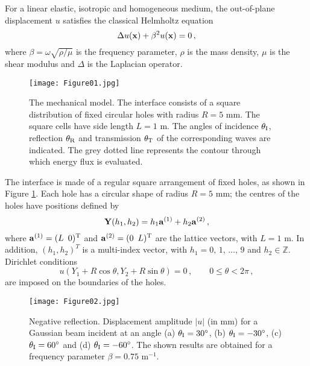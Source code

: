 \documentclass[10p]{article}
\begin{document}
For a linear elastic, isotropic and homogeneous medium, the out-of-plane displacement $u$ satisfies the classical Helmholtz equation
\begin{equation}
\label{eqn002}
\Delta u({\bf x}) + \beta^2 u({\bf x}) = 0\,,
\end{equation}
where $\beta=\omega\sqrt{\rho/\mu}$ is the frequency parameter, $\rho$ is the mass density, $\mu$ is the shear modulus and $\Delta$ is the Laplacian operator.

\begin{figure}
\begin{center}
\texttt{[image: Figure01.jpg]}%
\end{center}
\caption{\label{Fig01} The mechanical model. The interface consists of a square distribution of fixed circular holes with radius $R=5$ mm. The square cells have side length $L=1$ m. The angles of incidence $\theta_{\textup I}$, reflection $\theta_{\textup R}$ and transmission $\theta_{\textup T}$ of the corresponding waves are indicated. The grey dotted line represents the contour through which energy flux is evaluated.}
\end{figure}





The interface is made of a regular square arrangement of fixed holes, as shown in Figure \ref{Fig01}. Each hole has a circular shape of radius $R=5$ mm; the centres of the holes have positions defined by
\begin{equation}
\label{eqn003}
{\bf  Y}(h_1,h_2)=h_1 {\bf a}^{(1)}+h_2 {\bf a}^{(2)}\,, 
\end {equation}
where ${\bf a}^{(1)}=(L\,\,\,0)^{\textup T}$ and ${\bf a}^{(2)}=(0\,\,\,L)^{\textup T}$ are the lattice vectors, with $L=1$ m. In addition, $(h_1,h_2)^T$ is a multi-index vector\cite{Kittel1956}, with $h_1=0,\,1,\,\ldots,\,9$ and $h_2\in\mathbb Z$.
Dirichlet conditions
\begin{equation}
\label{eqn004}
u(Y_1+R\cos\theta,Y_2+R\sin\theta)=0\,, \qquad 0\le \theta< 2\pi\,,
\end{equation}
are imposed on the boundaries of the holes.




\begin{figure}
\begin{center}
\texttt{[image: Figure02.jpg]}
\end{center}
\caption{\label{Fig02} Negative reflection. Displacement amplitude $|u|$ (in mm) for a Gaussian beam incident at an angle (a) $\theta_\textup{I}=30^\circ$, (b) $\theta_\textup{I}=-30^\circ$, (c) $\theta_\textup{I}=60^\circ$ and (d) $\theta_\textup{I}=-60^\circ$. The shown results are obtained for a frequency parameter $\beta=0.75$ $\mbox{m}^{-1}$.}
\end{figure}
\end{document}
